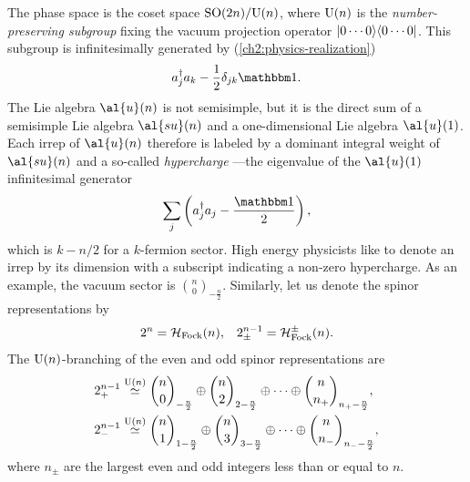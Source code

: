 The phase space is the coset space $\text{SO}(2n)/\text{U}(n)$, where $\text{U}(n)$ is the \emph{number-preserving subgroup} fixing the vacuum projection operator ${\left\vert{0\cdots 0}\right\rangle}{\left\langle{0\cdots 0}\right\vert}$. This subgroup is infinitesimally generated by (\autoref{ch2:physics-realization})
\begin{align}
a_j\dgg a_k - \frac{1}{2}\delta_{jk}\id.
\end{align}
The Lie algebra $\al{u}(n)$ is not semisimple, but it is the direct sum of a semisimple Lie algebra $\al{su}(n)$ and a one-dimensional Lie algebra $\al{u}(1)$. Each irrep of $\al{u}(n)$ therefore is labeled by a dominant integral weight of $\al{su}(n)$ and a so-called \emph{hypercharge} ---the eigenvalue of the $\al{u}(1)$ infinitesimal generator
\begin{align}
	\sum_j \left( a_j\dgg a_j - \frac{\id}{2} \right),
\end{align}
which is $k-n/2$ for a $k$-fermion sector.
High energy physicists like to denote an irrep by its dimension with a subscript indicating a non-zero hypercharge. As an example, the vacuum sector is ${n \choose 0}_{-\frac{n}{2}}$. Similarly, let us denote the spinor representations by
\begin{align}
	2^n = \mathcal{H}_{\text{Fock}}(n), && 2^{n-1}_{\pm} = \mathcal{H}_{\text{Fock}}^{\pm}(n). 
\end{align}
The $\text{U}(n)$-branching of the even and odd spinor representations are
\begin{align}
	2^{n-1}_+ &\stackrel{\gr{U}{n}}{\simeq}
		{n \choose 0}_{-\frac{n}{2}} \oplus {n \choose 2}_{2-\frac{n}{2}} \oplus \cdots \oplus {n \choose n_+}_{n_+-\frac{n}{2}}, \label{u(n)-branching} \\
	2^{n-1}_- &\stackrel{\gr{U}{n}}{\simeq}
		{n \choose 1}_{1-\frac{n}{2}} \oplus {n \choose 3}_{3-\frac{n}{2}} \oplus \cdots \oplus {n \choose n_-}_{n_--\frac{n}{2}},
\end{align}
where $n_{\pm}$ are the largest even and odd integers less than or equal to $n$.


